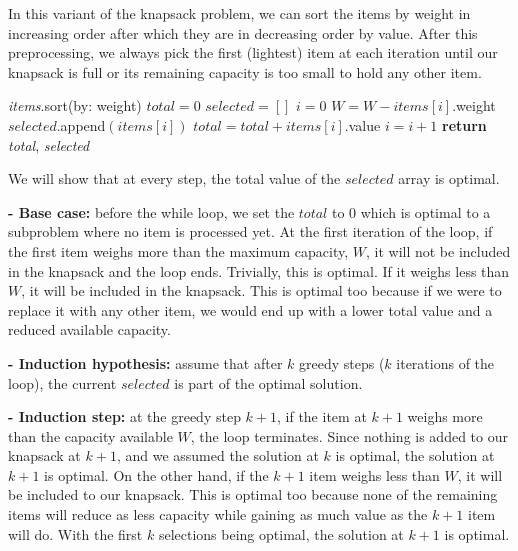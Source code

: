 \documentclass[11pt]{article}
\theoremstyle{definition}
\theoremstyle{theorem}
\begin{document}
In this variant of the knapsack problem, we can sort the items by weight in increasing order after which they are in decreasing order by value. After this preprocessing, we always pick the first (lightest) item at each iteration until our knapsack is full or its remaining capacity is too small to hold any other item.

\begin{algorithmic}[1]
 
	\State \textit{items}.sort(by: weight) 
	\State $\textit{total} = 0$ 
	\State $\textit{selected} = []$
	\State $i = 0$
		\State $W = W - \textit{items}[i]$.weight
		\State $\textit{selected}$.append$(\textit{items}[i])$
		\State $\textit{total} = \textit{total} + \textit{items}[i]$.value
		\State $i = i + 1$
	\EndWhile
	\State \textbf{return} \textit{total}, \textit{selected}
\EndFunction
\end{algorithmic}

We will show that at every step, the total value of the $\textit{selected}$ array is optimal.

\textbf{- Base case:} before the while loop, we set the $\textit{total}$ to 0 which is optimal to a subproblem where no item is processed yet. At the first iteration of the loop, if the first item weighs more than the maximum capacity, $W$, it will not be included in the knapsack and the loop ends. Trivially, this is optimal. If it weighs less than $W$, it will be included in the knapsack. This is optimal too because if we were to replace it with any other item, we would end up with a lower total value and a reduced available capacity.

\textbf{- Induction hypothesis:} assume that after $k$ greedy steps ($k$ iterations of the loop), the current $\textit{selected}$ is part of the optimal solution.

\textbf{- Induction step:} at the greedy step $k+1$, if the item at $k+1$ weighs more than the capacity available $W$, the loop terminates. Since nothing is added to our knapsack at $k+1$, and we assumed the solution at $k$ is optimal, the solution at $k+1$ is optimal. On the other hand, if the $k+1$ item weighs less than $W$, it will be included to our knapsack. This is optimal too because none of the remaining items will reduce as less capacity while gaining as much value as the $k+1$ item will do. With the first $k$ selections being optimal, the solution at $k+1$ is optimal.
\end{document}
